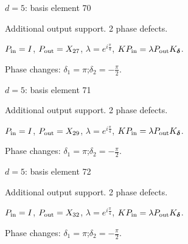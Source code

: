 \vfill
{\footnotesize\texttt{}}
\newpage
{}
{\Large $d=5$: basis element 70}\par
Additional output support. 2 phase defects.
\begin{center}
\end{center}
\vspace{-1mm}
$P_{\rm in}=I$, \quad $P_{\rm out}=X_{27}$, \quad $\lambda=e^{i\frac{\pi}{4}}$, \qquad $K P_{\rm in}=\lambda P_{\rm out}K_{\boldsymbol\delta}$.
\par\smallskip\begin{minipage}{.98\linewidth}\small Phase changes: $\delta_{1}=\pi$;\quad $\delta_{2}=-\frac{\pi}{2}$.\end{minipage}
\vfill
{\footnotesize\texttt{}}
\newpage
{}
{\Large $d=5$: basis element 71}\par
Additional output support. 2 phase defects.
\begin{center}
\end{center}
\vspace{-1mm}
$P_{\rm in}=I$, \quad $P_{\rm out}=X_{29}$, \quad $\lambda=e^{i\frac{\pi}{4}}$, \qquad $K P_{\rm in}=\lambda P_{\rm out}K_{\boldsymbol\delta}$.
\par\smallskip\begin{minipage}{.98\linewidth}\small Phase changes: $\delta_{1}=\pi$;\quad $\delta_{2}=-\frac{\pi}{2}$.\end{minipage}
\vfill
{\footnotesize\texttt{}}
\newpage
{}
{\Large $d=5$: basis element 72}\par
Additional output support. 2 phase defects.
\begin{center}
\end{center}
\vspace{-1mm}
$P_{\rm in}=I$, \quad $P_{\rm out}=X_{32}$, \quad $\lambda=e^{i\frac{\pi}{4}}$, \qquad $K P_{\rm in}=\lambda P_{\rm out}K_{\boldsymbol\delta}$.
\par\smallskip\begin{minipage}{.98\linewidth}\small Phase changes: $\delta_{1}=\pi$;\quad $\delta_{2}=-\frac{\pi}{2}$.\end{minipage}
\vfill
{\footnotesize\texttt{}}
